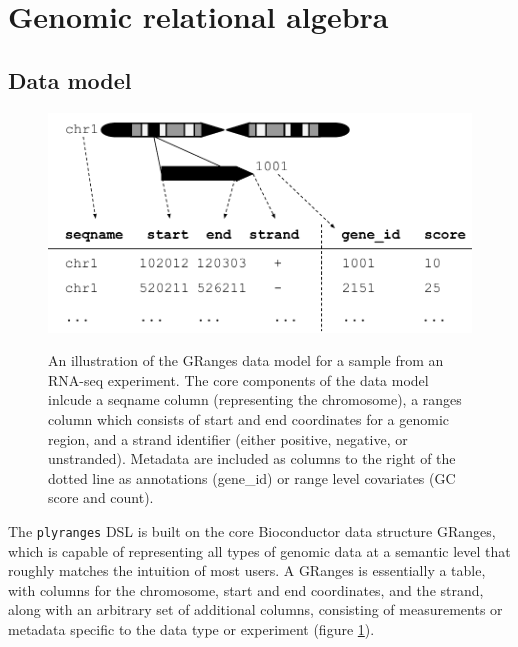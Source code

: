 \documentclass[10pt,letterpaper]{article}
\begin{document}
\hypertarget{genomic-relational-algebra}{%
\section{Genomic relational algebra}\label{genomic-relational-algebra}}

\hypertarget{data-model}{%
\subsection{Data model}\label{data-model}}

\begin{figure}
{\centering \includegraphics[width=400pt]{diagrams/GRanges}}
\caption{An illustration of the GRanges data model for a
sample from an RNA-seq experiment. The core components of the data model
inlcude a seqname column (representing the chromosome), a ranges column
which consists of start and end coordinates for a genomic region, and a
strand identifier (either positive, negative, or unstranded). Metadata
are included as columns to the right of the dotted line as annotations
(gene\_id) or range level covariates (GC score and count).}
\label{fig:GRanges} 
\end{figure}

The \texttt{plyranges} DSL is built on the core Bioconductor data
structure GRanges, which is capable of representing all types of genomic
data at a semantic level that roughly matches the intuition of most
users. A GRanges is essentially a table, with columns for the
chromosome, start and end coordinates, and the strand, along with an
arbitrary set of additional columns, consisting of measurements or
metadata specific to the data type or experiment (figure
\ref{fig:GRanges}).
\end{document}
